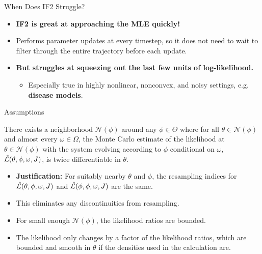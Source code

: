 \documentclass{beamer}
\begin{document}
\begin{frame}{When Does IF2 Struggle?}

\begin{itemize}
    \item \textbf{IF2 is great at approaching the MLE quickly!}
    \item \pause Performs parameter updates at every timestep, so it does not need to wait to filter through the entire trajectory before each update.
    \item \pause \textbf{But struggles at squeezing out the last few units of log-likelihood.}
    \begin{itemize}
        \item \pause Especially true in highly nonlinear, nonconvex, and noisy settings, e.g. \textbf{disease models}. 
    \end{itemize}
\end{itemize}

\end{frame}

\begin{frame}{Assumptions}
        
    \begin{aspt}
    \label{assump:smooth-nbhd}
    There exists a neighborhood $\mathcal{N}(\phi)$ around any $\phi \in \Theta$ where for all $\theta \in \mathcal{N}(\phi)$ and almost every $\omega \in \Omega$, the Monte Carlo estimate of the likelihood at $\theta \in \mathcal{N}(\phi)$ with the system evolving according to $\phi$ conditional on $\omega$, $\hat{\mathcal{L}}(\theta,\phi,\omega, J)$, is twice differentiable in $\theta$. 
    \end{aspt}

    \begin{itemize}
        \item \pause \textbf{Justification:} For suitably nearby $\theta$ and $\phi$, the resampling indices for $\hat{\mathcal{L}}(\theta,\phi,\omega, J)$ and $\hat{\mathcal{L}}(\phi,\phi,\omega, J)$ are the same.
        \item \pause This eliminates any discontinuities from resampling.
        \item \pause For small enough $\mathcal{N}(\phi)$, the likelihood ratios are bounded. 
        \item \pause The likelihood only changes by a factor of the likelihood ratios, which are bounded and smooth in $\theta$ if the densities used in the calculation are. 
    \end{itemize}
    
\end{frame}
\end{document}
